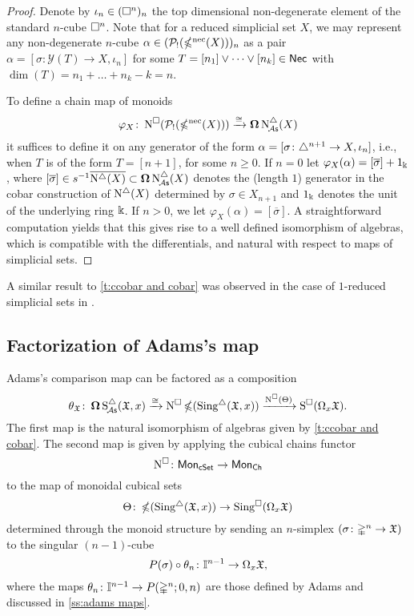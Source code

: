 \begin{proof}
	Denote by $\iota_n \in (\square^n)_n$ the top dimensional non-degenerate element of the standard $n$-cube $\square^n$.
	Note that for a reduced simplicial set $X$, we may represent any non-degenerate $n$-cube $\alpha \in (\mathcal{P}_!(\operatorname{\mathbb{\Omega}^{\mathrm{nec}}}(X)))_n$ as a pair $\alpha = [\sigma \colon \mathcal{Y}(T) \to X, \iota_n]$ for some $T = [n_1] \vee \dots \vee [n_k] \in \mathsf{Nec}$ with $\dim(T) = n_1 + \dots + n_k - k = n$.

	To define a chain map of monoids
	\[
	\varphi_X \colon \operatorname{N^{\square}}(\mathcal{P}_!(\operatorname{\mathbb{\Omega}^{\mathrm{nec}}}(X))) \xrightarrow{\cong} \operatorname{\mathbf{\Omega}} \operatorname{N^{\triangle}_{\!{\mathcal{A}\mathsf{s}}}}(X)
	\]
	it suffices to define it on any generator of the form $\alpha=[\sigma \colon \triangle^{n+1} \to X, \iota_{n}]$, i.e., when $T$ is of the form $T = [n+1]$, for some $n \geq 0$.
	If $n = 0$ let $\varphi_X(\alpha)= [\overline{\sigma}] + 1_\Bbbk$, where $[\overline{\sigma}] \in s^{-1} \overline{ \operatorname{N^{\triangle}}(X)} \subset \operatorname{\mathbf{\Omega}} \operatorname{N^{\triangle}_{\!{\mathcal{A}\mathsf{s}}}}(X)$ denotes the (length $1$) generator in the cobar construction of $\operatorname{N^{\triangle}}(X)$ determined by $\sigma \in X_{n+1}$ and $1_\Bbbk$ denotes the unit of the underlying ring $\Bbbk$.
	If $n > 0$, we let $\varphi_X(\alpha)=[\overline{\sigma}]$.
	A straightforward computation yields that this gives rise to a well defined isomorphism of algebras, which is compatible with the differentials, and natural with respect to maps of simplicial sets.
\end{proof}

A similar result to \cref{t:ccobar and cobar} was observed in the case of $1$-reduced simplicial sets in \cite[Section~3.5]{berger1995loops}.

\subsection{Factorization of Adams's map}\label{ss:factorization of adams}
Adams's comparison map can be factored as a composition
\begin{equation}\label{e:factorization of adams}
	\theta_{\mathfrak{X}} \colon \operatorname{\mathbf{\Omega}} \operatorname{S^{\triangle}_{\!{\mathcal{A}\mathsf{s}}}}(\mathfrak{X},x) \xrightarrow{\cong}
	\operatorname{N^{\square}} \operatorname{\mathbb{\Omega}}(\operatorname{Sing^{\triangle}}(\mathfrak{X},x)) \xrightarrow{\operatorname{N^{\square}}(\Theta)}
	\operatorname{S^{\square}}(\Omega_x \mathfrak{X}).
\end{equation}
The first map is the natural isomorphism of algebras given by \cref{t:ccobar and cobar}.
The second map is given by applying the cubical chains functor \[
\operatorname{N^{\square}} \colon \mathsf{Mon}_{\mathsf{cSet}} \to \mathsf{Mon}_{\mathsf{Ch}}
\] to the map of monoidal cubical sets
\[
\Theta \colon \operatorname{\mathbb{\Omega}}(\operatorname{Sing^{\triangle}}(\mathfrak{X},x)) \to \operatorname{Sing^{\square}}(\Omega_x \mathfrak{X})
\]
determined through the monoid structure by sending an $n$-simplex $(\sigma \colon \mathbb{\Delta}^n \to \mathfrak{X})$ to the singular $(n-1)$-cube
\[
P(\sigma) \circ \theta_n \colon \mathbb{I}^{n-1} \to \Omega_x \mathfrak{X},
\]
where the maps $\theta_n \colon \mathbb{I}^{n-1} \to P(\mathbb{\Delta}^n;0,n)$ are those defined by Adams and discussed in \cref{ss:adams maps}.

